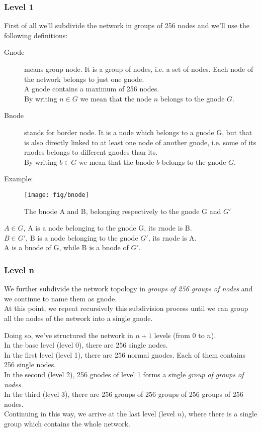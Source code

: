\documentclass[a4paper]{article}
\begin{document}
\subsubsection{Level 1}
First of all we'll subdivide the network in groups of 256 nodes and we'll use
the following definitions:
\begin{description}
	\item[Gnode] means group node. It is a group of nodes, i.e. a set of
		nodes. Each node of the network belongs to just one gnode.\\
		A gnode contains a maximum of 256 nodes.\\
		By writing $n \in G$ we mean that the node $n$ belongs to the
		gnode $G$.
	\item[Bnode] stands for border node. It is a node which belongs to a
		gnode G, but that is also directly linked to at least one node
		of another gnode, i.e. some of its rnodes belongs to different
		gnodes than its.\\
		By writing $b \in G$ we mean that the bnode $b$ belongs to the
		gnode $G$.
\end{description}

Example:\\
\begin{figure}[h]
	\begin{center}
		\texttt{[image: fig/bnode]}
	\end{center}
	\caption{The bnode A and B, belonging respectively to the gnode G and
	$G'$}
\end{figure}
$A \in G $, A is a node belonging to the gnode G, its rnode is B.\\
$B \in G'$, B is a node belonging to the gnode $G'$, its rnode is A.\\
A is a bnode of G, while B is a bnode of $G'$.

\subsubsection{Level n}
We further subdivide the network topology in \emph{groups of 256 groups of nodes}
and we continue to name them as gnode.\\
At this point, we repeat recursively this subdivision process until
we can group all the nodes of the network into a single gnode.

Doing so, we've structured the network in $n+1$ levels (from $0$ to $n$).\\
In the base level (level 0), there are 256 single nodes.\\
In the first level (level 1), there are 256 normal gnodes. Each of them
contains 256 single nodes.\\
In the second (level 2), 256 gnodes of level 1 forms a single \emph{group of
groups of nodes}.\\
In the third (level 3), there are 256 groups of 256 groups of 256 groups of
256 nodes.\\
Continuing in this way, we arrive at the last level (level $n$), where there
is a single group which contains the whole network.\\
\end{document}
